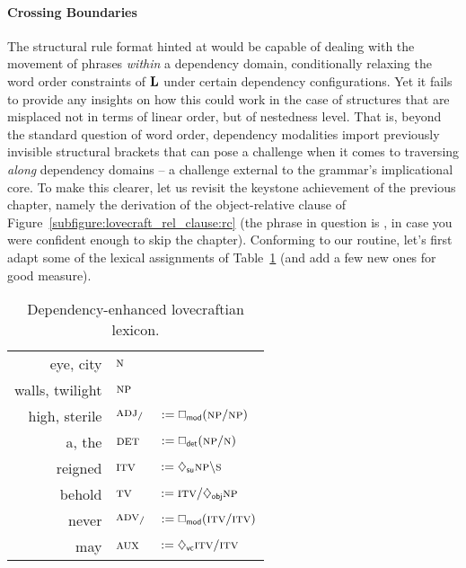 \paragraph{Crossing Boundaries}
The structural rule format hinted at would be capable of dealing with the movement of phrases \textit{within} a dependency domain, conditionally relaxing the word order constraints of $\textbf{L}$ under certain dependency configurations.
Yet it fails to provide any insights on how this could work in the case of structures that are misplaced not in terms of linear order, but of nestedness level.
That is, beyond the standard question of word order, dependency modalities import previously invisible structural brackets that can pose a challenge when it comes to traversing \textit{along} dependency domains -- a challenge external to the grammar's implicational core.
To make this clearer, let us revisit the keystone achievement of the previous chapter, namely the derivation of the object-relative clause of Figure~\ref{subfigure:lovecraft_rel_clause:rc} (the phrase in question is , in case you were confident enough to skip the chapter).
Conforming to our routine, let's first adapt some of the lexical assignments of Table~\ref{table:toy_dep_lexicon} (and add a few new ones for good measure).

\begin{table}
	\centering
	\begin{tabularx}{0.65\textwidth}{@{}r@{\quad::\quad}ll}
		eye, city									& $\smalln$\\
		walls, twilight								& $\smallnp$\\
		high, sterile								& $\textsc{\normalfont\textsc{adj}}_{/}$ & $:=\dbox{mod}(\smallnp\divright\smallnp)$\\
		a, the										& $\textsc{\normalfont\textsc{det}}$ & $:= \dbox{det}(\smallnp\divright\smalln)$\\
		reigned										& $\textsc{\normalfont\textsc{itv}}$ & $:=\ddia{su}\smallnp\divleft\smalls$\\
		behold										& $\textsc{\normalfont\textsc{tv}}$ & $:= \smallgtype{itv}\divright\ddia{obj}\smallnp$\\
		never										& $\textsc{\normalfont\textsc{adv}}_{/}$ & $:= \dbox{mod}(\smallgtype{itv}\divright\smallgtype{itv})$\\
		may											& $\textsc{\normalfont\textsc{aux}}$ & $:= \ddia{vc}\smallgtype{itv}\divright\smallgtype{itv}$
	\end{tabularx}
	\caption{Dependency-enhanced lovecraftian lexicon.}
	\label{table:toy_dep_lexicon}
\end{table}

